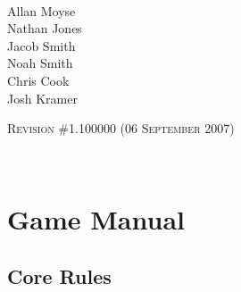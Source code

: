 \documentclass[twoside]{book}
\begin{document}
\begin{titlepage}
~\\~\\~\\~\\~\\~\\~\\~\\~\\~\\
\begin{center}
\ARPG \\

\hspace*{6em}
\vbox{\vspace{-2em}
\small Allan Moyse \\
Nathan Jones \\
Jacob Smith \\
Noah Smith \\
Chris Cook \\
Josh Kramer}

\vskip 2in
\textsc{Revision \#1.100000 (06 September 2007)}
\end{center}

\end{titlepage}

~
\setcounter{page}{1}
\setcounter{tocdepth}{3}
\tableofcontents
\newpage
\listoftables
\newpage
\listoffigures
\newpage
{}
\setcounter{page}{1}


  
\part{Game Manual}
    
\chapter{Core Rules}
    
\end{document}
